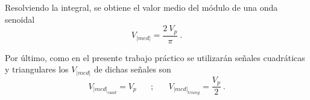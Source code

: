             \noindent Resolviendo la integral, se obtiene el valor medio del módulo de una 
            onda senoidal 
            \begin{equation*}
                V_{|med|} = \dfrac{2~V_p}{\pi}~.
            \end{equation*}
            
            Por último, como en el presente trabajo práctico se 
            utilizarán señales cuadráticas y triangulares los \(V_{|med|}\)
            de dichas señales son
            \begin{equation}
                V_{|med|_{cuad}} = V_p \hspace{20pt};\hspace{20pt} \label{eqn:VmedioSeñales}
                V_{|med|_{triang}} = \dfrac{V_p}{2}~.
            \end{equation}
